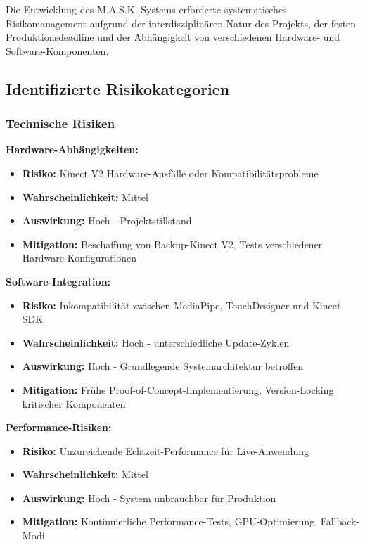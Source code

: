 Die Entwicklung des M.A.S.K.-Systems erforderte systematisches Risikomanagement aufgrund der interdisziplinären Natur des Projekts, der festen Produktionsdeadline und der Abhängigkeit von verschiedenen Hardware- und Software-Komponenten.

\subsection{Identifizierte Risikokategorien}

\subsubsection{Technische Risiken}

\textbf{Hardware-Abhängigkeiten:}
\begin{itemize}
    \item \textbf{Risiko:} Kinect V2 Hardware-Ausfälle oder Kompatibilitätsprobleme
    \item \textbf{Wahrscheinlichkeit:} Mittel
    \item \textbf{Auswirkung:} Hoch - Projektstillstand
    \item \textbf{Mitigation:} Beschaffung von Backup-Kinect V2, Tests verschiedener Hardware-Konfigurationen
\end{itemize}

\textbf{Software-Integration:}
\begin{itemize}
    \item \textbf{Risiko:} Inkompatibilität zwischen MediaPipe, TouchDesigner und Kinect SDK
    \item \textbf{Wahrscheinlichkeit:} Hoch - unterschiedliche Update-Zyklen
    \item \textbf{Auswirkung:} Hoch - Grundlegende Systemarchitektur betroffen
    \item \textbf{Mitigation:} Frühe Proof-of-Concept-Implementierung, Version-Locking kritischer Komponenten
\end{itemize}

\textbf{Performance-Risiken:}
\begin{itemize}
    \item \textbf{Risiko:} Unzureichende Echtzeit-Performance für Live-Anwendung
    \item \textbf{Wahrscheinlichkeit:} Mittel
    \item \textbf{Auswirkung:} Hoch - System unbrauchbar für Produktion
    \item \textbf{Mitigation:} Kontinuierliche Performance-Tests, GPU-Optimierung, Fallback-Modi
\end{itemize}

